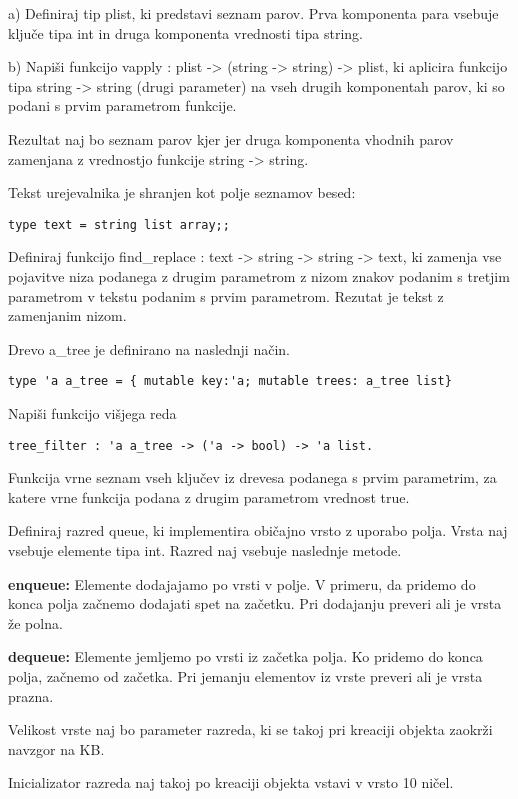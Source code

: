 \begin{ex}
  a) Definiraj tip plist, ki predstavi seznam parov. Prva komponenta
  para vsebuje klju\v ce tipa int in druga komponenta vrednosti tipa
  string.

  b) Napi\v si funkcijo vapply : plist -> (string -> string) -> plist,
  ki aplicira funkcijo tipa string -> string (drugi parameter) na vseh
  drugih komponentah parov, ki so podani s prvim parametrom
  funkcije. 

  Rezultat naj bo seznam parov kjer jer druga komponenta vhodnih parov
  zamenjana z vrednostjo funkcije string -> string.


\end{ex} 
\begin{ex}
  Tekst urejevalnika je shranjen kot polje seznamov besed:

\begin{verbatim}
type text = string list array;;
\end{verbatim}
  
  Definiraj funkcijo find\_replace : text -> string -> string -> text,
  ki zamenja vse pojavitve niza podanega z drugim parametrom z nizom
  znakov podanim s tretjim parametrom v tekstu podanim s prvim
  parametrom. Rezutat je tekst z zamenjanim nizom.


\end{ex} 
\begin{ex}
  Drevo a\_tree je definirano na naslednji na\v cin.

\begin{verbatim}
type 'a a_tree = { mutable key:'a; mutable trees: a_tree list}
\end{verbatim}

  Napi\v si funkcijo vi\v sjega reda

\begin{verbatim}
tree_filter : 'a a_tree -> ('a -> bool) -> 'a list.
\end{verbatim}

  Funkcija vrne seznam vseh klju\v cev iz drevesa podanega s prvim
  parametrim, za katere vrne funkcija podana z drugim parametrom
  vrednost true.


\end{ex} 
\begin{ex}
  Definiraj razred queue, ki implementira obi\v cajno vrsto z uporabo
  polja. Vrsta naj vsebuje elemente tipa int. Razred naj vsebuje
  naslednje metode.

  \textbf{enqueue:} Elemente dodajajamo po vrsti v polje. V primeru,
  da pridemo do konca polja za\v cnemo dodajati spet na za\v
  cetku. Pri dodajanju preveri ali je vrsta \v ze polna.
                 
  \textbf{dequeue:} Elemente jemljemo po vrsti iz za\v cetka polja. Ko
  pridemo do konca polja, za\v cnemo od za\v cetka. Pri jemanju
  elementov iz vrste preveri ali je vrsta prazna.

  Velikost vrste naj bo parameter razreda, ki se takoj pri kreaciji
  objekta zaokr\v zi navzgor na KB.

  Inicializator razreda naj takoj po kreaciji objekta vstavi v vrsto
  10 ni\v cel.


\end{ex}
